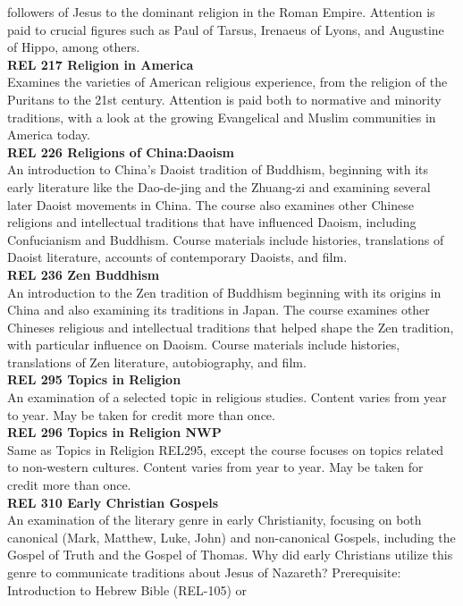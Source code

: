 \documentclass[
  letterpaper,
]{scrbook}
\begin{document}
followers of Jesus to the dominant religion in the Roman Empire.
Attention is paid to crucial figures such as Paul of Tarsus, Irenaeus of
Lyons, and Augustine of Hippo, among others.\\
\textbf{REL 217 Religion in America}\\
Examines the varieties of American religious experience, from the
religion of the Puritans to the 21st century. Attention is paid both to
normative and minority traditions, with a look at the growing
Evangelical and Muslim communities in America today.\\
\textbf{REL 226 Religions of China:Daoism}\\
An introduction to China's Daoist tradition of Buddhism, beginning with
its early literature like the Dao-de-jing and the Zhuang-zi and
examining several later Daoist movements in China. The course also
examines other Chinese religions and intellectual traditions that have
influenced Daoism, including Confucianism and Buddhism. Course materials
include histories, translations of Daoist literature, accounts of
contemporary Daoists, and film.\\
\textbf{REL 236 Zen Buddhism}\\
An introduction to the Zen tradition of Buddhism beginning with its
origins in China and also examining its traditions in Japan. The course
examines other Chineses religious and intellectual traditions that
helped shape the Zen tradition, with particular influence on Daoism.
Course materials include histories, translations of Zen literature,
autobiography, and film.\\
\textbf{REL 295 Topics in Religion}\\
An examination of a selected topic in religious studies. Content varies
from year to year. May be taken for credit more than once.\\
\textbf{REL 296 Topics in Religion NWP}\\
Same as Topics in Religion REL295, except the course focuses on topics
related to non-western cultures. Content varies from year to year. May
be taken for credit more than once.\\
\textbf{REL 310 Early Christian Gospels}\\
An examination of the literary genre in early Christianity, focusing on
both canonical (Mark, Matthew, Luke, John) and non-canonical Gospels,
including the Gospel of Truth and the Gospel of Thomas. Why did early
Christians utilize this genre to communicate traditions about Jesus of
Nazareth? Prerequisite: Introduction to Hebrew Bible (REL-105) or
\end{document}
